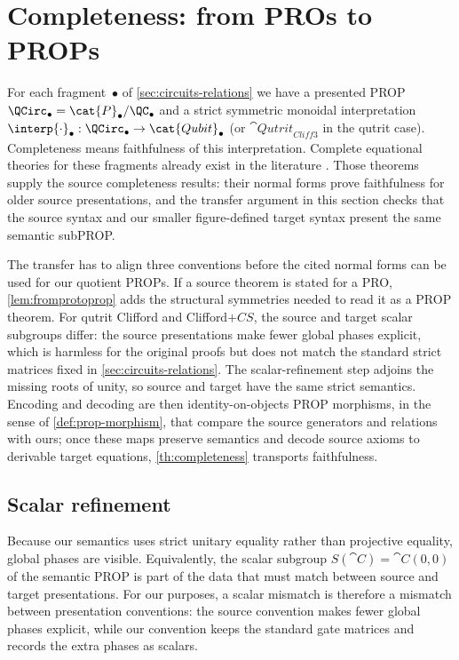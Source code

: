 \section{Completeness: from PROs to PROPs}
\label{sec:completeness}

For each fragment~\(\bullet\) of \cref{sec:circuits-relations} we have a presented PROP
\(\QCirc_\bullet=\cat{P}_\bullet/\QC_\bullet\) and a strict symmetric monoidal interpretation
\(\interp{\cdot}_\bullet:\QCirc_\bullet\to\cat{Qubit}_\bullet\) (or
\(\cat{Qutrit}_{\mathit{Cliff3}}\) in the qutrit case).  Completeness means faithfulness of this
interpretation.  Complete equational theories for these fragments already exist in the
literature
\cite{SelingerStabilizer,SelingerRealStabilizer,qutritclifford,SelingerCliffordPlusT,SelingerCliffordPlusCS,AmyCNOTDihedral}.
Those theorems supply the source completeness results: their normal forms prove faithfulness for
older source presentations, and the transfer argument in this section checks that the source syntax
and our smaller figure-defined target syntax present the same semantic subPROP.

The transfer has to align three conventions before the cited normal forms can be used for our
quotient PROPs.  If a source theorem is stated for a PRO, \cref{lem:fromprotoprop} adds the
structural symmetries needed to read it as a PROP theorem.  For qutrit Clifford and
Clifford\(+CS\), the source and target scalar subgroups differ: the source presentations make fewer
global phases explicit, which is harmless for the original proofs but does not match the standard
strict matrices fixed in \cref{sec:circuits-relations}.  The scalar-refinement step adjoins the
missing roots of unity, so source and target have the same strict semantics.  Encoding and decoding
are then identity-on-objects PROP morphisms, in the sense of \cref{def:prop-morphism}, that compare
the source generators and relations with ours; once these maps preserve semantics and decode source
axioms to derivable target equations, \cref{th:completeness} transports faithfulness.

\subsection{Scalar refinement}
\label{subsec:scalar-refinement}

Because our semantics uses strict unitary equality rather than projective equality, global phases
are visible.  Equivalently, the scalar subgroup \(S(\cat{C})=\cat{C}(0,0)\) of the semantic PROP is
part of the data that must match between source and target presentations.
For our purposes, a scalar mismatch is therefore a mismatch between presentation conventions: the
source convention makes fewer global phases explicit, while our convention keeps the standard gate
matrices and records the extra phases as scalars.

